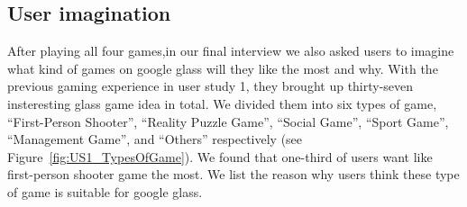

\subsection{User imagination}
After playing all four games,in our final interview we also asked users to imagine what kind of games on google glass will they like the most and why. With the previous gaming experience in user study 1, they brought up thirty-seven insteresting glass game idea in total. We divided them into six types of game, ``First-Person Shooter'', ``Reality Puzzle Game'', ``Social Game'', ``Sport Game'', ``Management Game'', and ``Others'' respectively (see Figure~\ref{fig:US1_TypesOfGame}). We found that one-third of users want like first-person shooter game the most. We list the reason why users think these type of game is suitable for google glass.

